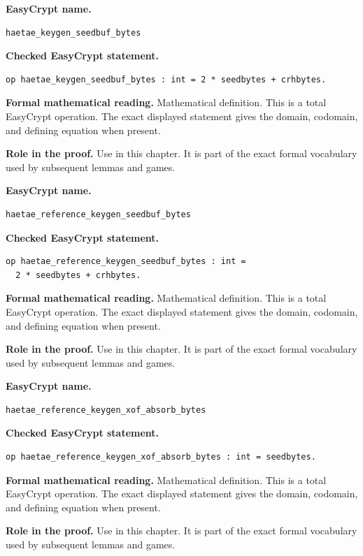 \begin{formaldefinition}
\noindent\textbf{EasyCrypt name.}
\begin{lstlisting}[language=EasyCrypt,basicstyle=\ttfamily\scriptsize]
haetae_keygen_seedbuf_bytes
\end{lstlisting}
\noindent\textbf{Checked EasyCrypt statement.}
\begin{lstlisting}[language=EasyCrypt,basicstyle=\ttfamily\scriptsize]
op haetae_keygen_seedbuf_bytes : int = 2 * seedbytes + crhbytes.
\end{lstlisting}
\noindent\textbf{Formal mathematical reading.}
Mathematical definition. This is a total EasyCrypt operation.  The exact displayed statement gives the domain, codomain, and defining equation when present.

\noindent\textbf{Role in the proof.}
Use in this chapter. It is part of the exact formal vocabulary used by subsequent lemmas and games.

\end{formaldefinition}

\begin{formaldefinition}
\noindent\textbf{EasyCrypt name.}
\begin{lstlisting}[language=EasyCrypt,basicstyle=\ttfamily\scriptsize]
haetae_reference_keygen_seedbuf_bytes
\end{lstlisting}
\noindent\textbf{Checked EasyCrypt statement.}
\begin{lstlisting}[language=EasyCrypt,basicstyle=\ttfamily\scriptsize]
op haetae_reference_keygen_seedbuf_bytes : int =
  2 * seedbytes + crhbytes.
\end{lstlisting}
\noindent\textbf{Formal mathematical reading.}
Mathematical definition. This is a total EasyCrypt operation.  The exact displayed statement gives the domain, codomain, and defining equation when present.

\noindent\textbf{Role in the proof.}
Use in this chapter. It is part of the exact formal vocabulary used by subsequent lemmas and games.

\end{formaldefinition}

\begin{formaldefinition}
\noindent\textbf{EasyCrypt name.}
\begin{lstlisting}[language=EasyCrypt,basicstyle=\ttfamily\scriptsize]
haetae_reference_keygen_xof_absorb_bytes
\end{lstlisting}
\noindent\textbf{Checked EasyCrypt statement.}
\begin{lstlisting}[language=EasyCrypt,basicstyle=\ttfamily\scriptsize]
op haetae_reference_keygen_xof_absorb_bytes : int = seedbytes.
\end{lstlisting}
\noindent\textbf{Formal mathematical reading.}
Mathematical definition. This is a total EasyCrypt operation.  The exact displayed statement gives the domain, codomain, and defining equation when present.

\noindent\textbf{Role in the proof.}
Use in this chapter. It is part of the exact formal vocabulary used by subsequent lemmas and games.

\end{formaldefinition}


